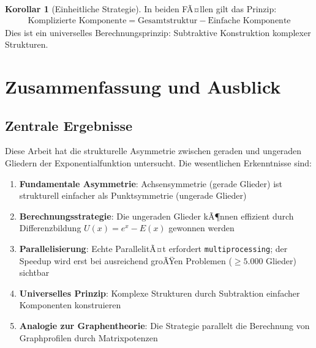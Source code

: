 ﻿\documentclass[a4paper,12pt]{article}
\theoremstyle{definition}
\newtheorem{korollar}{Korollar}
\begin{document}
\begin{korollar}[Einheitliche Strategie]
In beiden FÃ¤llen gilt das Prinzip:
\begin{align}
  \text{Komplizierte Komponente}
    = \text{Gesamtstruktur} - \text{Einfache Komponente}
\end{align}
Dies ist ein universelles Berechnungsprinzip:
Subtraktive Konstruktion komplexer Strukturen.
\end{korollar}

\section{Zusammenfassung und Ausblick}

\subsection{Zentrale Ergebnisse}

Diese Arbeit hat die strukturelle Asymmetrie zwischen geraden und ungeraden
Gliedern der Exponentialfunktion untersucht. Die wesentlichen Erkenntnisse
sind:

\begin{enumerate}
  \item \textbf{Fundamentale Asymmetrie}: Achsensymmetrie (gerade Glieder)
        ist strukturell einfacher als Punktsymmetrie (ungerade Glieder)
  \item \textbf{Berechnungsstrategie}: Die ungeraden Glieder kÃ¶nnen effizient
        durch Differenzbildung $U(x) = e^x - E(x)$ gewonnen werden
  \item \textbf{Parallelisierung}: Echte ParallelitÃ¤t erfordert
        \texttt{multiprocessing}; der Speedup wird erst bei ausreichend
        groÃŸen Problemen ($\geq 5.000$ Glieder) sichtbar
  \item \textbf{Universelles Prinzip}: Komplexe Strukturen durch Subtraktion
        einfacher Komponenten konstruieren
  \item \textbf{Analogie zur Graphentheorie}: Die Strategie parallelt die
        Berechnung von Graphprofilen durch Matrixpotenzen
\end{enumerate}
\end{document}
